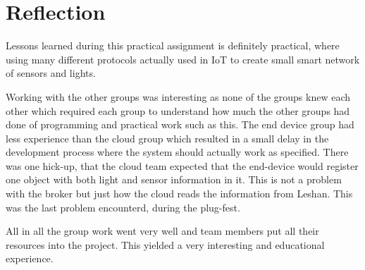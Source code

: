 \section{Reflection}

Lessons learned during this practical assignment is definitely practical, where using many different protocols actually used in IoT to create small smart network of sensors and lights.

Working with the other groups was interesting as none of the groups knew each other which required each group to understand how much the other groups had done of programming and practical work such as this. The end device group had less experience than the cloud group which resulted in a small delay in the development process where the system should actually work as specified. There was one hick-up, that the cloud team expected that the end-device would register one object with both light and sensor information in it. This is not a problem with the broker but just how the cloud reads the information from Leshan. This was the last problem encounterd, during the plug-fest.

All in all the group work went very well and team members put all their resources into the project. This yielded a very interesting and educational experience.
